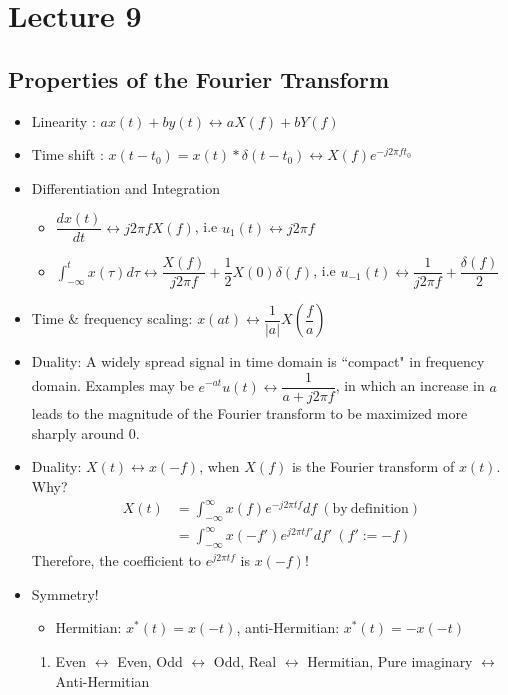 \documentclass{article}
\begin{document}
\section{Lecture 9}
\subsection{Properties of the Fourier Transform}
\begin{itemize}
    \item Linearity : $ax(t)+by(t)\leftrightarrow aX(f)+bY(f)$
    \item Time shift : $x(t-t_0)=x(t)*\delta(t-t_0)\leftrightarrow X(f)e^{-j2\pi ft_0}$
    \item Differentiation and Integration
    \begin{itemize}
        \item $\dfrac{dx(t)}{dt}\leftrightarrow j2\pi fX(f)$, i.e $u_1(t)\leftrightarrow j2\pi f$
        \item $ \displaystyle\int_{-\infty}^{t}{x(\tau)d\tau}\leftrightarrow\dfrac{X(f)}{j2\pi f}+\dfrac{1}{2}X(0)\delta(f)$, i.e $u_{-1}(t)\leftrightarrow \dfrac{1}{j2\pi f}+\dfrac{\delta(f)}{2}$
    \end{itemize}
    \item Time \& frequency scaling: $x(at)\leftrightarrow \dfrac{1}{|a|}X(\dfrac{f}{a})$
    \item Duality: A widely spread signal in time domain is ``compact" in frequency domain. Examples may be $e^{-at}u(t)\leftrightarrow \dfrac{1}{a+j2\pi f}$, in which an increase in $a$ leads to the magnitude of the Fourier transform to be maximized more sharply around 0.
    \item Duality: $X(t)\leftrightarrow x(-f)$, when $X(f)$ is the Fourier transform of $x(t)$. Why?
    \begin{align*}
        X(t)&=\int_{-\infty}^{\infty}{x(f)e^{-j2\pi tf}df}\:(\mathrm{by\:definition})\\
        &=\int_{-\infty}^{\infty}{x(-f')e^{j2\pi tf'}df'}\:(f':=-f)
    \end{align*}
    Therefore, the coefficient to $e^{j2\pi tf}$ is $x(-f)$!
    \item Symmetry!
    \begin{itemize}
        \item Hermitian: $x^*(t)=x(-t)$, anti-Hermitian: $x^*(t)=-x(-t)$
    \end{itemize}
    \begin{enumerate}
        \item Even $\leftrightarrow$ Even, Odd $\leftrightarrow$ Odd, Real $\leftrightarrow$ Hermitian, Pure imaginary $\leftrightarrow$ Anti-Hermitian

\end{enumerate}
\end{itemize}
\end{document}
